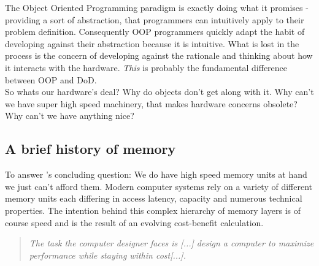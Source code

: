The Object Oriented Programming paradigm is exactly doing what it promises - providing a sort of abstraction, that programmers can intuitively apply to their problem definition. Consequently OOP programmers quickly adapt the habit of developing against their abstraction because it is intuitive. What is lost in the process is the concern of developing against the rationale and thinking about how it interacts with the hardware. \textit{This} is probably the fundamental difference between OOP and DoD.\\
So whats our hardware's deal? Why do objects don't get along with it. Why can't we have super high speed machinery, that makes hardware concerns obsolete? Why can't we have anything nice?

\subsection{A brief history of memory}
To answer 's concluding question: We do have high speed memory units at hand we just can't afford them. Modern computer systems rely on a variety of different memory units each differing in access latency, capacity and numerous technical properties. The intention behind this complex hierarchy of memory layers is of course speed and is the result of an evolving cost-benefit calculation.
\begin{quote}
	\textit{The task the computer designer faces is [...] design a computer to maximize
		performance while staying within cost[...].} 
\end{quote}

